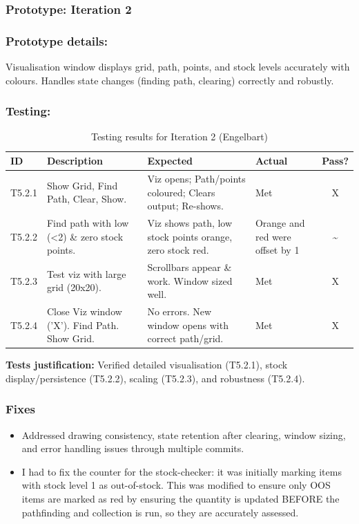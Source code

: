 \newpage
\subsubsection*{Prototype: Iteration 2}




\subsubsection{Prototype details:}
Visualisation window displays grid, path, points, and stock levels accurately with colours. Handles state changes (finding path, clearing) correctly and robustly.

\subsubsection{Testing:}
\begin{table}[htbp]
	\centering
	\begin{tabularx}{\textwidth}{|l|X|p{4.5cm}|p{1.5cm}|c|}
		\hline
		\textbf{ID} & \textbf{Description} & \textbf{Expected} & \textbf{Actual} & \textbf{Pass?} \\
		\hline
		T5.2.1 & Show Grid, Find Path, Clear, Show. & Viz opens; Path/points coloured; Clears output; Re-shows. & Met & X \\
		\hline
		T5.2.2 & Find path with low (<2) \& zero stock points. & Viz shows path, low stock points orange, zero stock red. & Orange and red were offset by 1 & \~{} \\
		\hline
		T5.2.3 & Test viz with large grid (20x20). & Scrollbars appear \& work. Window sized well. & Met & X \\
		\hline
		T5.2.4 & Close Viz window ('X'). Find Path. Show Grid. & No errors. New window opens with correct path/grid. & Met & X \\
		\hline
	\end{tabularx}
	\caption{Testing results for Iteration 2 (Engelbart)}
\end{table}
\textbf{Tests justification:} Verified detailed visualisation (T5.2.1), stock display/persistence (T5.2.2), scaling (T5.2.3), and robustness (T5.2.4).

\subsubsection{Fixes}
\begin{itemize}
	\item Addressed drawing consistency, state retention after clearing, window sizing, and error handling issues through multiple commits.
	
	\item I had to fix the counter for the stock-checker: it was initially marking items with stock level 1 as out-of-stock. This was modified to ensure only OOS items are marked as red by ensuring the quantity is updated BEFORE the pathfinding and collection is run, so they are accurately assessed.
\end{itemize}

